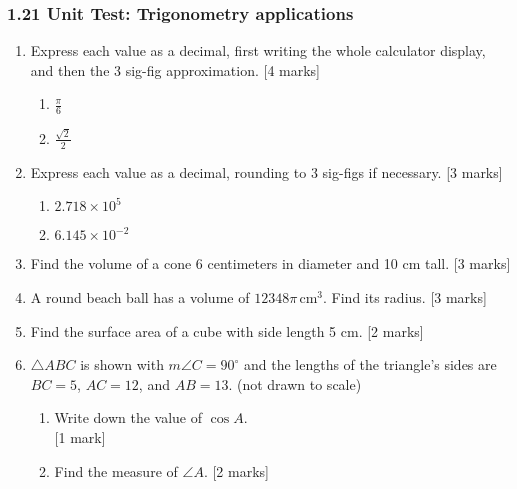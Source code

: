 \documentclass[12pt, twoside]{article}
\begin{document}
\subsubsection*{1.21 Unit Test: Trigonometry applications}

\begin{enumerate}

  \item Express each value as a decimal, first writing the whole calculator display, and then the 3 sig-fig approximation. \hfill [4 marks]
  \begin{multicols}{2}
    \begin{enumerate}
    \item $\displaystyle \frac{\pi}{6}$
    \item $\displaystyle \frac{\sqrt{2}}{2}$
    \end{enumerate}
  \end{multicols}

  \item Express each value as a decimal, rounding to 3 sig-figs if necessary. \hfill [3 marks]
  \begin{multicols}{2}
    \begin{enumerate}
    \item $2.718 \times 10^5$
    \item $6.145 \times 10^{-2}$
    \end{enumerate}
  \end{multicols}

  \item Find the volume of a cone 6 centimeters in diameter and 10 cm tall. \hfill [3 marks]
  
  \item A round beach ball has a volume of $12348\pi \,\mathrm{ cm}^3$. Find its radius. \hfill [3 marks]
  
  \item Find the surface area of a cube with side length 5 cm. \hfill [2 marks]
  
  \item $\triangle ABC$ is shown with $m\angle C=90^\circ$ and the lengths of the triangle's sides are $BC=5$, $AC=12$, and $AB=13$. (not drawn to scale)
  \begin{multicols}{2}
        \begin{enumerate}
        \item Write down the value of $\cos A$.  \\ \hfill [1 mark]\vspace{0.5cm}
        \item Find the measure of $\angle A$.  \hfill [2 marks] \vspace{1cm}
      \end{enumerate}
    \end{multicols}


\end{enumerate}
\end{document}
